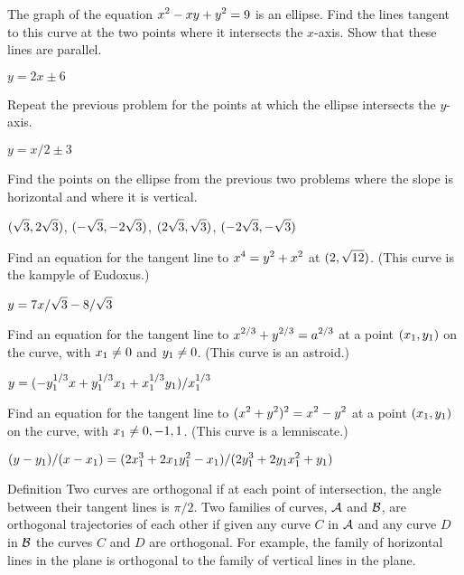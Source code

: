 \begin{exercises}
\exercise The graph of the equation $\displaystyle x^2 - xy + y^2 = 9$ is an ellipse.
Find the lines tangent to this curve at the two
 points where it intersects the $x$-axis. Show that these lines are
 parallel.
\begin{answer} $y=2x\pm6$
\end{answer}

\exercise Repeat the previous problem for the points at which the
 ellipse intersects the $y$-axis.
\begin{answer} $y=x/2\pm3$
\end{answer}

\exercise Find the points on the ellipse from the previous two problems
 where the slope is horizontal and where it is vertical.
\begin{answer} $\displaystyle (\sqrt3,2\sqrt3)$, $\displaystyle (-\sqrt3,-2\sqrt3)$, $\displaystyle (2\sqrt3,\sqrt3)$,
$\displaystyle (-2\sqrt3,-\sqrt3)$ 
\end{answer}

\exercise Find an equation for the tangent line to 
$\displaystyle x^4 = y^2 + x^2$ at $\displaystyle (2, \sqrt{12})$. 
(This curve is the {\dfont kampyle of Eudoxus}.)
\begin{answer} $\displaystyle y=7x/\sqrt3-8/\sqrt3$
\end{answer}

\exercise Find an equation for the tangent line to $\displaystyle x^{2/3} +
y^{2/3} = a^{2/3}$ at a point $\displaystyle (x_1 ,y_1)$ on the curve, 
with $\displaystyle x_1 \neq 0$ and $\displaystyle y_1 \neq 0$. (This curve is an {\dfont astroid}.)
\begin{answer} $\displaystyle y=(-y_1^{1/3}x+y_1^{1/3}x_1+x_1^{1/3}y_1)/x_1^{1/3}$
\end{answer}

\exercise Find an equation for the tangent line to $\displaystyle (x^2 +y^2 )^2 =x^2
-y^2$ at a point $\displaystyle (x_1 , y_1)$ on the curve, with $\displaystyle x_1 \neq 0, -1, 1$.
(This curve is a {\dfont lemniscate}.)
\begin{answer} $\displaystyle (y-y_1)/(x-x_1)=(2x_1^3+2x_1y_1^2-x_1)/(2y_1^3+2y_1x_1^2+y_1)$
\end{answer}

\begin{remark}{Definition}
Two curves are {\dfont orthogonal\/} if at each point of intersection,
the angle between their tangent lines is $\pi/2$. Two
families of curves, $\cal{A}$ and $\cal{B}$, are
{\dfont orthogonal trajectories} of each other if given any curve $C$
in $\cal{A}$ and any curve $D$ in $\cal{B}$ the curves $C$
and $D$ are orthogonal.
For example, the family of horizontal lines in the plane is
orthogonal to the family of vertical lines in the plane.
\end{remark}


\end{exercises}
